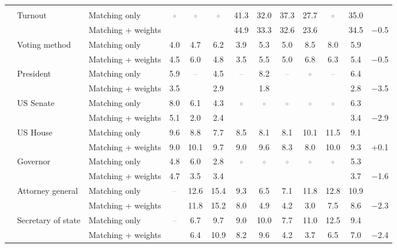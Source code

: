\begin{table}[!htbp]
{\begin{threeparttable}
\begin{tabular}{llcccccccccc}
\addlinespace[0.3em]
\multicolumn{12}{l}{Non-demographic} \\
\addlinespace[0.1em]
~~Turnout & Matching only & \textcolor{gray}{$\circ$} & \textcolor{gray}{$\circ$} & \textcolor{gray}{$\circ$} & 41.3 & 32.0 & 37.3 & 27.7 & \textcolor{gray}{$\circ$} & 35.0 & \\
 & Matching + weights &  &  &  & 44.9 & 33.3 & 32.6 & 23.6 &  & 34.5 & $-$0.5 \\
\addlinespace[0.1em]
~~Voting method & Matching only & 4.0 & 4.7 & 6.2 & 3.9 & 5.3 & 5.0 & 8.5 & 8.0 & 5.9 & \\
 & Matching + weights & 4.5 & 6.0 & 4.8 & 3.5 & 5.5 & 5.0 & 6.8 & 6.3 & 5.4 & $-$0.5 \\
\addlinespace[0.1em]
~~President & Matching only & 5.9 & \textcolor{gray}{--} & 4.5 & \textcolor{gray}{--} & 8.2 & \textcolor{gray}{--} & \textcolor{gray}{$\circ$} & \textcolor{gray}{--} & 6.4 & \\
 & Matching + weights & 3.5 &  & 2.9 &  & 1.8 &  &  &  & 2.8 & $-$3.5 \\
\addlinespace[0.1em]
~~US Senate & Matching only & 8.0 & 6.1 & 4.3 & \textcolor{gray}{$\circ$} & \textcolor{gray}{$\circ$} & \textcolor{gray}{$\circ$} & \textcolor{gray}{$\circ$} & \textcolor{gray}{$\circ$} & 6.3 & \\
 & Matching + weights & 5.1 & 2.0 & 2.4 &  &  &  &  &  & 3.4 & $-$2.9 \\
\addlinespace[0.1em]
~~US House & Matching only & 9.6 & 8.8 & 7.7 & 8.5 & 8.1 & 8.1 & 10.1 & 11.5 & 9.1 & \\
 & Matching + weights & 9.0 & 10.1 & 9.7 & 9.0 & 9.6 & 8.3 & 8.0 & 10.0 & 9.3 & +0.1 \\
\addlinespace[0.1em]
~~Governor & Matching only & 4.8 & 6.0 & 2.8 & \textcolor{gray}{$\circ$} & \textcolor{gray}{$\circ$} & \textcolor{gray}{$\circ$} & \textcolor{gray}{$\circ$} & \textcolor{gray}{$\circ$} & 5.3 & \\
 & Matching + weights & 4.7 & 3.5 & 3.4 &  &  &  &  &  & 3.7 & $-$1.6 \\
\addlinespace[0.1em]
~~Attorney general & Matching only & \textcolor{gray}{--} & 12.6 & 15.4 & 9.3 & 6.5 & 7.1 & 11.8 & 12.8 & 10.9 & \\
 & Matching + weights &  & 11.8 & 15.2 & 8.0 & 4.9 & 4.2 & 3.0 & 7.5 & 8.6 & $-$2.3 \\
\addlinespace[0.1em]
~~Secretary of state & Matching only & \textcolor{gray}{--} & 6.7 & 9.7 & 9.0 & 10.0 & 7.7 & 11.0 & 12.5 & 9.4 & \\
 & Matching + weights &  & 6.4 & 10.9 & 8.2 & 9.6 & 4.2 & 3.7 & 6.5 & 7.0 & $-$2.4 \\

\end{tabular}
\end{threeparttable}}
\end{table}
